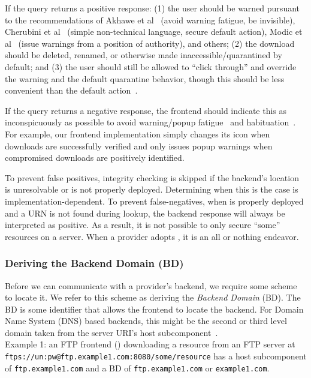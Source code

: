 If the query returns a positive response: (1) the user should be warned pursuant
to the recommendations of Akhawe et al~\cite{Akhawe} (avoid warning fatigue, be
invisible), Cherubini et al~\cite{Cherubini} (simple non-technical language,
secure default action), Modic et al~\cite{Modic} (issue warnings from a position
of authority), and others; (2) the download should be deleted, renamed, or
otherwise made inaccessible/quarantined by default; and (3) the user should
still be allowed to ``click through'' and override the warning and the default
quarantine behavior, though this should be less convenient than the default
action~\cite{Cherubini}.

If the query returns a negative response, the frontend should indicate this as
inconspicuously as possible to avoid warning/popup fatigue~\cite{Akhawe,
Cherubini} and habituation~\cite{Sunshine}. For example, our frontend
implementation simply changes its icon when downloads are successfully verified
and only issues popup warnings when compromised downloads are positively
identified.

To prevent false positives, integrity checking is skipped if the backend's
location is unresolvable or \SYSTEM{} is not properly deployed. Determining when
this is the case is implementation-dependent. To prevent false-negatives, when
\SYSTEM{} is properly deployed and a URN is not found during lookup, the backend
response will always be interpreted as positive. As a result, it is not possible
to only secure ``some'' resources on a server. When a provider adopts \SYSTEM{},
it is an all or nothing endeavor.

\subsubsection{Deriving the Backend Domain (BD)}

Before we can communicate with a provider's backend, we require some scheme to
locate it. We refer to this scheme as deriving the \emph{Backend Domain} (BD).
The BD is some identifier that allows the frontend to locate the backend. For
Domain Name System (DNS) based backends, this might be the second or third level
domain taken from the server URI's host subcomponent~\cite{RFC3986}. \\

Example 1: an FTP frontend () downloading a
resource from an FTP server at
\texttt{ftps://un:pw@ftp.example1.com:8080/some/resource} has a host
subcomponent of \texttt{ftp.example1.com} and a BD of \texttt{ftp.example1.com}
or \texttt{example1.com}. \\

